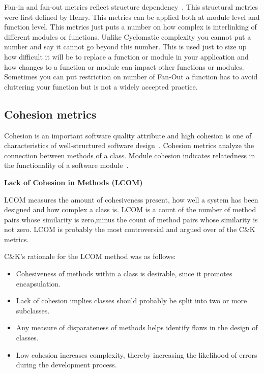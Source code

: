 Fan-in and fan-out metrics reflect structure dependency~\cite{fanin}.
This structural metrics were first defined by Henry.
This metrics can be applied both at module level and function level. This metrics just puts a number on how complex is interlinking of different modules or functions. Unlike Cyclomatic complexity you cannot put a number and say it cannot go beyond this number. This is used just to size up how
difficult it will be to replace a function or module in your application and how changes to a function or module can impact other functions or modules. Sometimes you can put restriction on number of Fan-Out a function has to avoid cluttering your function but is not a widely accepted practice.


\subsection{Cohesion metrics}
Cohesion is an important software quality attribute and high cohesion is one of characteristics of well-structured software design~\cite{cohesion}.
Cohesion metrics analyze the connection between methods of a class.
Module cohesion indicates relatedness in the functionality of a software module~\cite{cohesion2}.

\textbf{Lack of Cohesion in Methods (LCOM)}

LCOM measures the amount of cohesiveness present, how well a system has been designed and how complex a class is. LCOM is a count of the number of method pairs whose similarity is zero,minus the count of method pairs whose similarity is not zero. LCOM is probably the most controversial and argued over of the C\&K metrics.

C\&K's rationale for the LCOM method was as follows:
\begin{itemize}
	\item Cohesiveness of methods within a class is desirable, since it promotes encapsulation.
	\item Lack of cohesion implies classes should probably be split into two or more subclasses.
	\item Any measure of disparateness of methods helps identify flaws in the design of classes. 
	\item Low cohesion increases complexity, thereby increasing the likelihood of errors during the development process.
\end{itemize}

